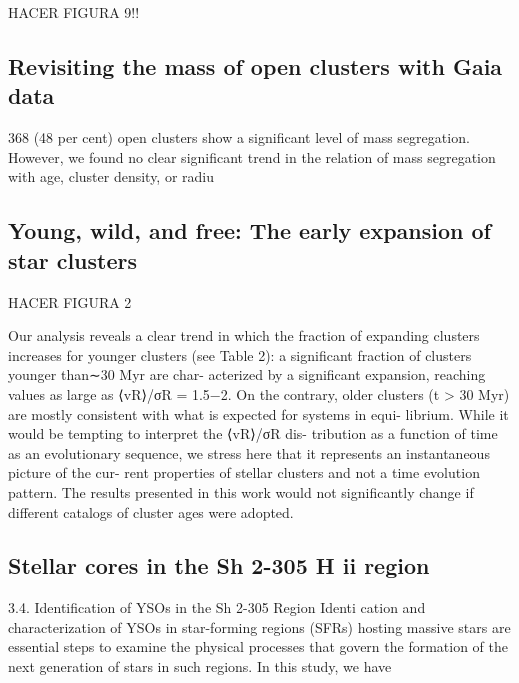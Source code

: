 \documentclass[../Main.tex]{subfiles}
\begin{document}
{HACER FIGURA 9!!

\subsection{Revisiting the mass of open clusters with Gaia data}



 368 (48
per cent) open clusters show a significant level of mass segregation.
However, we found no clear significant trend in the relation of mass
segregation with age, cluster density, or radiu
\subsection{Young, wild, and free: The early expansion of star clusters}
HACER FIGURA 2

Our analysis reveals a clear trend in which the fraction of
expanding clusters increases for younger clusters (see Table 2):
a significant fraction of clusters younger than∼30 Myr are char-
acterized by a significant expansion, reaching values as large as
⟨vR⟩/σR = 1.5−2. On the contrary, older clusters (t > 30 Myr)
are mostly consistent with what is expected for systems in equi-
librium. While it would be tempting to interpret the ⟨vR⟩/σR dis-
tribution as a function of time as an evolutionary sequence, we
stress here that it represents an instantaneous picture of the cur-
rent properties of stellar clusters and not a time evolution pattern.
The results presented in this work would not significantly change
if diﬀerent catalogs of cluster ages were adopted.


\subsection{Stellar cores in the Sh 2-305 H ii region}


3.4. Identification of YSOs in the Sh 2-305 Region
Identi cation and characterization of YSOs in star-forming
regions (SFRs) hosting massive stars are essential steps to
examine the physical processes that govern the formation of the
next generation of stars in such regions. In this study, we have

}
\end{document}
